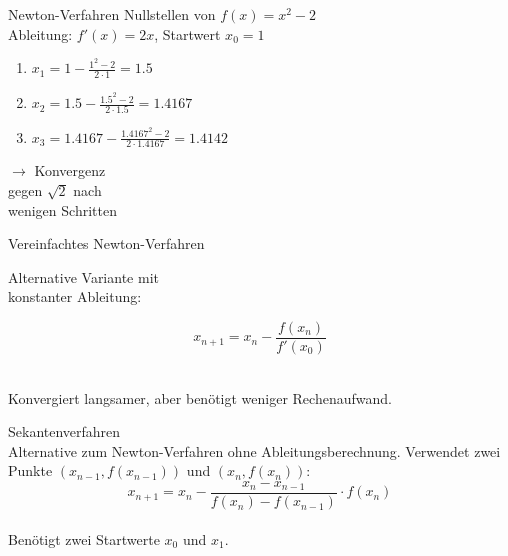 \begin{example2}{Newton-Verfahren} Nullstellen von $f(x)=x^2-2$\\
Ableitung: $f'(x) = 2x$, Startwert $x_0 = 1$
\vspace{1mm}\\
\begin{minipage}[t]{0.65\textwidth}
    \vspace{-3mm}
    \begin{enumerate}
        \item $x_1 = 1 - \frac{1^2-2}{2 \cdot 1} = 1.5$
        \item $x_2 = 1.5 - \frac{1.5^2-2}{2 \cdot 1.5} = 1.4167$
        \item $x_3 = 1.4167 - \frac{1.4167^2-2}{2 \cdot 1.4167} = 1.4142$
    \end{enumerate}
\end{minipage}
\begin{minipage}[t]{0.3\textwidth}
    $\rightarrow$ Konvergenz \\ gegen $\sqrt{2}$ nach \\ wenigen Schritten
\end{minipage}
\end{example2}

\begin{theorem}{Vereinfachtes Newton-Verfahren}\\
    \begin{minipage}{0.5\textwidth}
        Alternative Variante mit \\ konstanter Ableitung:
    \end{minipage}
    \begin{minipage}{0.25\textwidth}
        \vspace{-5mm}
        $$x_{n+1} = x_n - \frac{f(x_n)}{f'(x_0)}$$
    \end{minipage}
    \vspace{1mm}\\
    Konvergiert langsamer, aber benötigt weniger Rechenaufwand.
\end{theorem}

\begin{concept}{Sekantenverfahren}\\
    Alternative zum Newton-Verfahren ohne Ableitungsberechnung. Verwendet zwei Punkte $(x_{n-1}, f(x_{n-1}))$ und $(x_n, f(x_n))$:
    \vspace{-2mm}\\
    $$x_{n+1} = x_n - \frac{x_n-x_{n-1}}{f(x_n)-f(x_{n-1})} \cdot f(x_n)$$
    \vspace{-3mm}\\
    Benötigt zwei Startwerte $x_0$ und $x_1$.
\end{concept}


